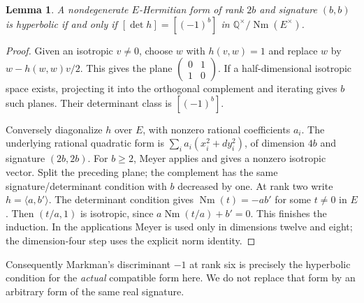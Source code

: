 \documentclass[11pt]{article}
\newcommand{\Q}{\mathbb Q}
\DeclareMathOperator{\Nm}{Nm}
\newtheorem{lemma}[theorem]{Lemma}
\theoremstyle{remark}
\begin{document}
\begin{lemma}\label{lem:hyperbolic}
A nondegenerate $E$-Hermitian form of rank $2b$ and signature $(b,b)$
is hyperbolic if and only if $[\det h]=[(-1)^b]$ in
$\Q^\times/\Nm(E^\times)$.
\end{lemma}
\begin{proof}
Given an isotropic $v\ne0$, choose $w$ with $h(v,w)=1$ and replace
$w$ by $w-h(w,w)v/2$. This gives the plane
$\left(\begin{smallmatrix}0&1\\1&0\end{smallmatrix}\right)$.
If a half-dimensional isotropic space exists, projecting it into
the orthogonal complement and iterating gives $b$ such planes.
Their determinant class is $[(-1)^b]$.

Conversely diagonalize $h$ over $E$, with nonzero rational coefficients
$a_i$. The underlying rational quadratic form is
$\sum_i a_i(x_i^2+d y_i^2)$, of dimension $4b$ and signature
$(2b,2b)$. For $b\geq2$, Meyer applies and gives a nonzero isotropic
vector. Split the preceding plane; the complement has the same
signature/determinant condition with $b$ decreased by one.
At rank two write $h=\langle a,b'\rangle$. The determinant condition
gives $\Nm(t)=-ab'$ for some $t\ne0$ in $E$. Then
$(t/a,1)$ is isotropic, since $a\Nm(t/a)+b'=0$.
This finishes the induction. In the applications Meyer is used only
in dimensions twelve and eight; the dimension-four step uses the
explicit norm identity.
\end{proof}

Consequently Markman's discriminant $-1$ at rank six is precisely
the hyperbolic condition for the \emph{actual} compatible form here.
We do not replace that form by an arbitrary form of the same real
signature.
\end{document}
